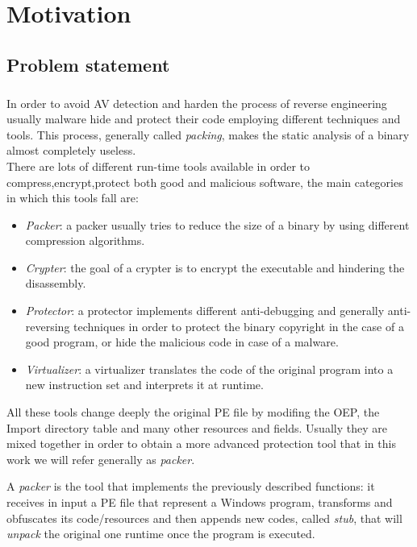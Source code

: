 \chapter{Motivation}
\label{chapter2}
\thispagestyle{empty}

\section{Problem statement}
\paragraph{}
In order to avoid \ac{AV} detection and harden the process of reverse engineering usually malware hide and protect their code employing different techniques and tools. This process, generally called \textit{packing}, makes the static analysis of a binary almost completely useless.\\There are lots of different run-time tools available in order to compress,encrypt,protect both good and malicious software, the main categories in which this tools fall are:
\begin{itemize}
\item \emph{Packer}: a packer usually tries to reduce the size of a binary by using different compression algorithms.
\item \emph{Crypter}: the goal of a crypter is to encrypt the executable and hindering the disassembly.
\item \emph{Protector}: a protector implements different anti-debugging and generally anti-reversing techniques in order to protect the binary copyright in the case of a good program, or hide the malicious code in case of a malware.
\item \emph{Virtualizer}: a virtualizer translates the code of the original program into a new  instruction set and  interprets it at runtime.
\end{itemize}

All these tools change deeply the original PE file by modifing the OEP, the Import directory table and many other resources and fields. Usually they are mixed together in order to obtain a more advanced protection tool that in this work we will refer generally as \textit{packer}.

A \textit{packer} is the tool that implements the previously described functions: it receives in input a PE file that represent a Windows program, transforms and obfuscates its code/resources and then appends new codes, called \textit{stub}, that will \textit{unpack} the original one runtime once the program is executed.\\\\

